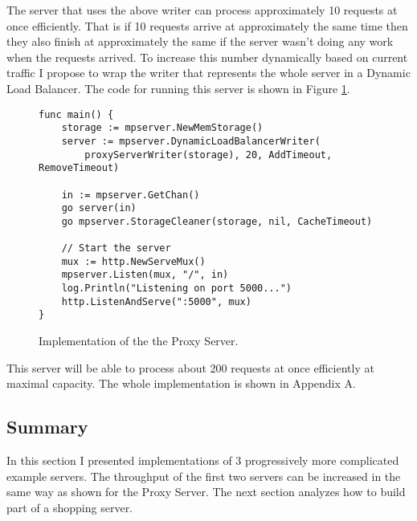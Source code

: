 \newpage
The server that uses the above writer can process approximately 10 requests
at once efficiently. That is if 10 requests arrive at approximately the same
time then they also finish at approximately the same if the server wasn't
doing any work when the requests arrived.
To increase this number dynamically based on current traffic I propose
to wrap the writer that represents the whole server in a Dynamic Load
Balancer. The code for running this server is shown in Figure 
\ref{fig:ProxyServerImpl}.
\begin{figure}[h]
\begin{lstlisting}
func main() {
    storage := mpserver.NewMemStorage()
    server := mpserver.DynamicLoadBalancerWriter(
        proxyServerWriter(storage), 20, AddTimeout, RemoveTimeout)

    in := mpserver.GetChan()
    go server(in)
    go mpserver.StorageCleaner(storage, nil, CacheTimeout)

    // Start the server
    mux := http.NewServeMux()
    mpserver.Listen(mux, "/", in)
    log.Println("Listening on port 5000...")
    http.ListenAndServe(":5000", mux)
}
\end{lstlisting}
\caption[scale=1.0]{Implementation of the the Proxy Server.}
\label{fig:ProxyServerImpl}
\end{figure}

This server will be able to process about 200 requests at once efficiently
at maximal capacity. The whole implementation is shown in Appendix A.

\subsection{Summary}
In this section I presented implementations of 3 progressively more 
complicated example servers. The throughput of the first two servers
can be increased in the same way as shown for the Proxy Server. The 
next section analyzes how to build part of a shopping server.


